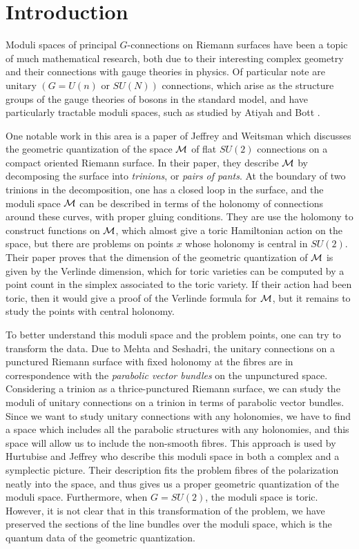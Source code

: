 \section{Introduction}
\label{s:intro}

	Moduli spaces of principal $G$-connections on Riemann surfaces have been a topic of much mathematical research, both due to their interesting complex geometry and their connections with gauge theories in physics. Of particular note are unitary $(G=U(n) \text{ or }SU(N))$ connections, which arise as the structure groups of the gauge theories of bosons in the standard model, and have particularly tractable moduli spaces, such as studied by Atiyah and Bott \cite{atiyah_yang-mills_1983}. 
	
	One notable work in this area is a paper of Jeffrey and Weitsman \cite{jeffrey_bohr-sommerfeld_1992} which discusses the geometric quantization of the space $\mathcal{M}$ of flat $SU(2)$ connections on a compact oriented Riemann surface. In their paper, they describe $\mathcal{M}$ by decomposing the surface into \textit{trinions}, or \textit{pairs of pants}. At the boundary of two trinions in the decomposition, one has a closed loop in the surface, and the moduli space $\mathcal{M}$ can be described in terms of the holonomy of connections around these curves, with proper gluing conditions. They are use the holomony to construct functions on $\mathcal{M}$, which almost give a toric Hamiltonian action on the space, but there are problems on points $x$ whose holonomy is central in $SU(2)$. Their paper proves that the dimension of the geometric quantization of $\mathcal{M}$ is given by the Verlinde dimension, which for toric varieties can be computed by a point count in the simplex associated to the toric variety. If their action had been toric, then it would give a proof of the Verlinde formula for $\mathcal{M}$, but it remains to study the points with central holonomy.
	
	To better understand this moduli space and the problem points, one can try to transform the data. Due to Mehta and Seshadri, the unitary connections on a punctured Riemann surface with fixed holonomy at the fibres are in correspondence with the \textit{parabolic vector bundles} on the unpunctured space. Considering a trinion as a thrice-punctured Riemann surface, we can study the moduli of unitary connections on a trinion in terms of parabolic vector bundles. Since we want to study unitary connections with any holonomies, we have to find a space which includes all the parabolic structures with any holonomies, and this space will allow us to include the non-smooth fibres. This approach is used by Hurtubise and Jeffrey \cite{hurtubise_moduli_2005}\cite{hurtubise_representations_2000} who describe this moduli space in both a complex and a symplectic picture. Their description fits the problem fibres of the polarization neatly into the space, and thus gives us a proper geometric quantization of the moduli space. Furthermore, when $G=SU(2)$, the moduli space is toric. However, it is not clear that in this transformation of the problem, we have preserved the sections of the line bundles over the moduli space, which is the quantum data of the geometric quantization.
	
